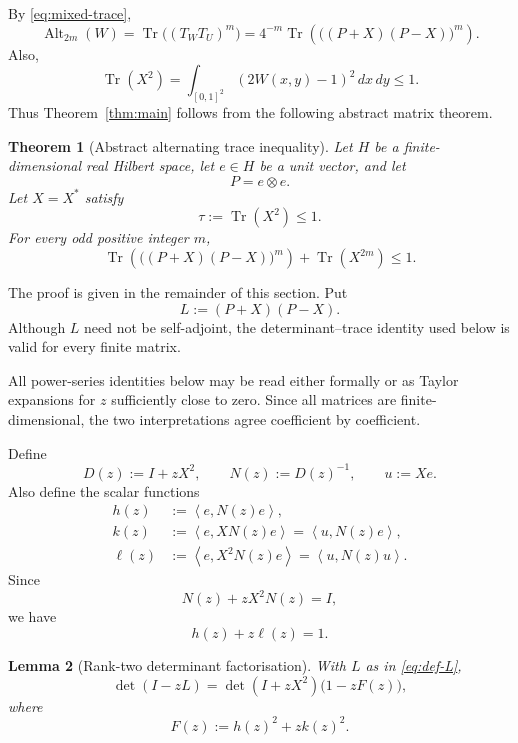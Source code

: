 \documentclass[11pt]{article}
\newtheorem{theorem}{Theorem}[section]
\newtheorem{lemma}[theorem]{Lemma}
\newcommand{\ip}[2]{\left\langle #1,#2\right\rangle}
\newcommand{\Tr}{\operatorname{Tr}}
\newcommand{\Alt}{\operatorname{Alt}}
\begin{document}
By \eqref{eq:mixed-trace},
\begin{equation}
  \Alt_{2m}(W)
  =\Tr\bigl((T_WT_U)^m\bigr)
  =4^{-m}\Tr\left(\bigl((P+X)(P-X)\bigr)^m\right).
  \label{eq:alt-trace}
\end{equation}
Also,
\begin{equation}
  \Tr(X^2)
  =\int_{[0,1]^2}(2W(x,y)-1)^2\,dx\,dy
  \le1.
  \label{eq:HS-budget}
\end{equation}
Thus Theorem~\ref{thm:main} follows from the following abstract matrix
theorem.

\begin{theorem}[Abstract alternating trace inequality]
\label{thm:matrix}
Let $H$ be a finite-dimensional real Hilbert space, let $e\in H$ be a
unit vector, and let
\[
  P=e\otimes e.
\]
Let $X=X^*$ satisfy
\[
  \tau:=\Tr(X^2)\le1.
\]
For every odd positive integer $m$,
\begin{equation}
  \Tr\left(\bigl((P+X)(P-X)\bigr)^m\right)
  +\Tr(X^{2m})
  \le1.
  \label{eq:matrix-main}
\end{equation}
\end{theorem}

The proof is given in the remainder of this section.  Put
\begin{equation}
  L:=(P+X)(P-X).
  \label{eq:def-L}
\end{equation}
Although $L$ need not be self-adjoint, the determinant--trace identity
used below is valid for every finite matrix.

All power-series identities below may be read either formally
or as Taylor expansions for $z$ sufficiently close to zero.  Since all
matrices are finite-dimensional, the two interpretations agree
coefficient by coefficient.

Define
\[
  D(z):=I+zX^2,
  \qquad
  N(z):=D(z)^{-1},
  \qquad
  u:=Xe.
\]
Also define the scalar functions
\begin{align}
  h(z)&:=\ip{e}{N(z)e},
  \label{eq:def-h}\\
  k(z)&:=\ip{e}{XN(z)e}=\ip{u}{N(z)e},
  \label{eq:def-k}\\
  \ell(z)&:=\ip{e}{X^2N(z)e}=\ip{u}{N(z)u}.
  \label{eq:def-ell}
\end{align}
Since
\[
  N(z)+zX^2N(z)=I,
\]
we have
\begin{equation}
  h(z)+z\ell(z)=1.
  \label{eq:h-ell}
\end{equation}

\begin{lemma}[Rank-two determinant factorisation]
\label{lem:det-factor}
With $L$ as in \eqref{eq:def-L},
\begin{equation}
  \det(I-zL)
  =
  \det(I+zX^2)
  \bigl(1-zF(z)\bigr),
  \label{eq:det-factor}
\end{equation}
where
\begin{equation}
  F(z):=h(z)^2+zk(z)^2.
  \label{eq:def-F}
\end{equation}
\end{lemma}
\end{document}
